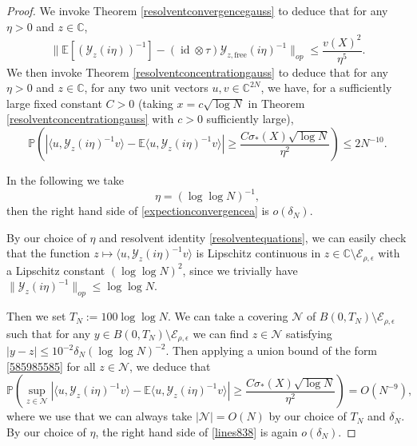 \documentclass[11pt,reqno]{amsart}
\theoremstyle{plain}
\theoremstyle{remark}
\numberwithin{equation}{section}
\begin{document}
\begin{proof}
We invoke Theorem \ref{resolventconvergencegauss} to deduce that for any $\eta>0$ and $z\in\mathbb{C}$,
\begin{equation}\label{expectionconvergencea}
   \|\mathbb{E}[(\mathcal{Y}_z(i\eta))^{-1}]-(\operatorname{id}\otimes\tau)\mathcal{Y}_{z,\text{free}}(i\eta)^{-1}\|_{op}\leq\frac{v(X)^2}{\eta^5}.
\end{equation} 
We then invoke Theorem \ref{resolventconcentrationgauss} to deduce that for any $\eta>0$ and $z\in\mathbb{C}$, for any two unit vectors $u,v\in\mathbb{C}^{2N}$, we have, for a sufficiently large fixed constant $C>0$ (taking $x=c\sqrt{\log N}$ in Theorem \ref{resolventconcentrationgauss} with $c>0$ sufficiently large),
\begin{equation}\label{585985585}
\mathbb{P}\left( \left| \langle u,
\mathcal{Y}_z(i\eta)^{-1}v\rangle -\mathbb{E}\langle u,\mathcal{Y}_z(i\eta)^{-1}v\rangle
\right|\geq \frac{C\sigma_*(X)\sqrt{\log N}}{\eta^2}\right)\leq 2N^{-10}.
\end{equation}

 In the following we take $$\eta=(\log\log N)^{-1},$$ then the right hand side of \eqref{expectionconvergencea} is $o(\delta_N)$.  

By our choice of $\eta$ and resolvent identity \eqref{resolventequations}, we can easily check that the function $z\mapsto \langle u, \mathcal{Y}_z(i\eta)^{-1}v\rangle$ is Lipschitz continuous in $z\in \mathbb{C}\setminus\mathcal{E}_{\rho,\epsilon}$ with a Lipschitz constant $(\log\log N)^2$, since we trivially have $\|\mathcal{Y}_z(i\eta)^{-1}\|_{op}\leq \log\log N.$ 


Then we set $T_N:=100\log\log N$. We can take a covering $\mathcal{N}$ of $B(0,T_N)\setminus\mathcal{E}_{\rho,\epsilon}$ such that for any $y\in B(0,T_N)\setminus\mathcal{E}_{\rho,\epsilon}$ we can find $z\in\mathcal{N}$ satisfying  $|y-z|\leq 10^{-2}\delta_N(\log\log N)^{-2}$. Then applying a union bound of the form \eqref{585985585} for all $z\in\mathcal{N}$, we deduce that \begin{equation}\label{lines838}
\mathbb{P}\left( \sup_{z\in\mathcal{N}}\left| \langle u,
\mathcal{Y}_z(i\eta)^{-1}v\rangle -\mathbb{E}\langle u,\mathcal{Y}_z(i\eta)^{-1}v\rangle
\right|\geq \frac{C\sigma_*(X)\sqrt{\log N}}{\eta^2}\right)= O( N^{-9}),
\end{equation} where we use that we can always take $|\mathcal{N}|=O(N)$ by our choice of $T_N$ and $\delta_N$. By our choice of $\eta$, the right hand side of \eqref{lines838} is again $o(\delta_N)$.



\end{proof}
\end{document}
